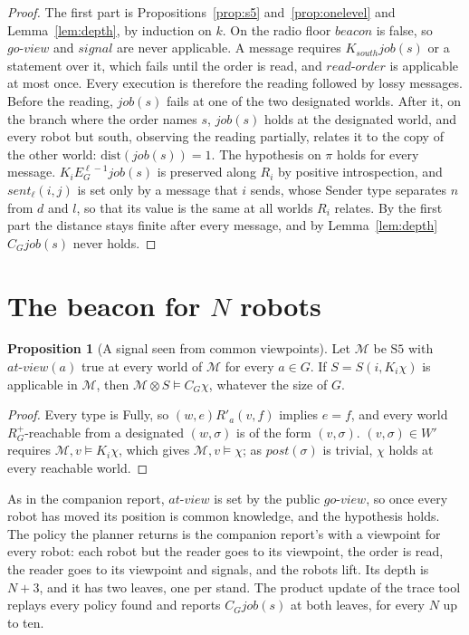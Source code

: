 \documentclass[11pt,a4paper]{article}
\theoremstyle{definition}
\newtheorem{proposition}{Proposition}
\newcommand{\Mod}{\mathcal{M}}
\newcommand{\prd}{\otimes}
\newcommand{\Kop}[1]{K_{#1}}
\newcommand{\Eop}[1]{E_{#1}}
\newcommand{\Cop}[1]{C_{#1}}
\newcommand{\ag}[1]{\mathit{#1}}
\newcommand{\job}{\mathit{job}}
\newcommand{\post}{\mathit{post}}
\newcommand{\dist}{\mathrm{dist}}
\newcommand{\atview}{\mathit{at\text{-}view}}
\newcommand{\sent}{\mathit{sent}}
\begin{document}
\begin{proof}
The first part is Propositions~\ref{prop:s5} and~\ref{prop:onelevel} and
Lemma~\ref{lem:depth}, by induction on $k$. On the radio floor
$\mathit{beacon}$ is false, so $\mathit{go\text{-}view}$ and $\mathit{signal}$
are never applicable. A message requires $\Kop{\ag{south}}\job(s)$ or a
statement over it, which fails until the order is read, and
$\mathit{read\text{-}order}$ is applicable at most once. Every execution is
therefore the reading followed by lossy messages. Before the reading,
$\job(s)$ fails at one of the two designated worlds. After it, on the branch
where the order names $s$, $\job(s)$ holds at the designated world, and every
robot but south, observing the reading partially, relates it to the copy of the
other world: $\dist(\job(s)) = 1$. The hypothesis on $\pi$ holds for every
message. $\Kop{i}\Eop{G}^{\ell-1}\job(s)$ is preserved along $R_i$ by positive
introspection, and $\sent_\ell(i,j)$ is set only by a message that $i$ sends,
whose Sender type separates $n$ from $d$ and $l$, so that its value is the same
at all worlds $R_i$ relates. By the first part the distance stays finite after
every message, and by Lemma~\ref{lem:depth} $\Cop{G}\job(s)$ never holds.
\end{proof}

\section{The beacon for $N$ robots}
\label{sec:beacon}

\begin{proposition}[A signal seen from common viewpoints]
\label{prop:public}
Let $\Mod$ be $\mathrm{S5}$ with $\atview(a)$ true at every world of $\Mod$ for
every $a \in G$. If $S = S(i,\Kop{i}\chi)$ is applicable in $\Mod$, then
$\Mod \prd S \models \Cop{G}\chi$, whatever the size of $G$.
\end{proposition}

\begin{proof}
Every type is Fully, so $(w,e) R'_a (v,f)$ implies $e = f$, and every world
$R_G^+$-reachable from a designated $(w,\sigma)$ is of the form $(v,\sigma)$.
$(v,\sigma) \in W'$ requires $\Mod, v \models \Kop{i}\chi$, which gives
$\Mod, v \models \chi$; as $\post(\sigma)$ is trivial, $\chi$ holds at every
reachable world.
\end{proof}

\noindent
As in the companion report, $\atview$ is set by the public
$\mathit{go\text{-}view}$, so once every robot has moved its position is common
knowledge, and the hypothesis holds. The policy the planner returns is the
companion report's with a viewpoint for every robot: each robot but the reader
goes to its viewpoint, the order is read, the reader goes to its viewpoint and
signals, and the robots lift. Its depth is $N + 3$, and it has two leaves, one
per stand. The product update of the trace tool replays every policy found and
reports $\Cop{G}\job(s)$ at both leaves, for every $N$ up to ten.
\end{document}
